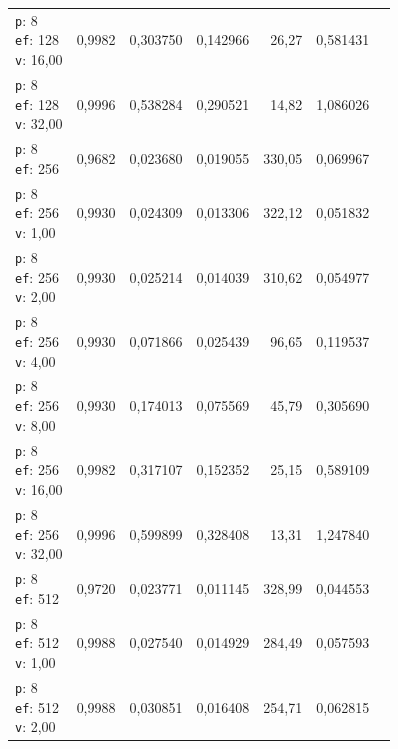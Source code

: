 \begin{table}[htbp]
\begin{tabularx}{\textwidth}{Xrrrrrr}
    \makecell{\texttt{p}: 8\\\texttt{ef}: 128\\\texttt{v}: 16,00} & 0,9982 & 0,303750 & 0,142966 & 26,27 & 0,581431 \\
    \makecell{\texttt{p}: 8\\\texttt{ef}: 128\\\texttt{v}: 32,00} & 0,9996 & 0,538284 & 0,290521 & 14,82 & 1,086026 \\
    \makecell{\texttt{p}: 8\\\texttt{ef}: 256} & 0,9682 & 0,023680 & 0,019055 & 330,05 & 0,069967 \\
    \makecell{\texttt{p}: 8\\\texttt{ef}: 256\\\texttt{v}: 1,00} & 0,9930 & 0,024309 & 0,013306 & 322,12 & 0,051832 \\
    \makecell{\texttt{p}: 8\\\texttt{ef}: 256\\\texttt{v}: 2,00} & 0,9930 & 0,025214 & 0,014039 & 310,62 & 0,054977 \\
    \makecell{\texttt{p}: 8\\\texttt{ef}: 256\\\texttt{v}: 4,00} & 0,9930 & 0,071866 & 0,025439 & 96,65 & 0,119537 \\
    \makecell{\texttt{p}: 8\\\texttt{ef}: 256\\\texttt{v}: 8,00} & 0,9930 & 0,174013 & 0,075569 & 45,79 & 0,305690 \\
    \makecell{\texttt{p}: 8\\\texttt{ef}: 256\\\texttt{v}: 16,00} & 0,9982 & 0,317107 & 0,152352 & 25,15 & 0,589109 \\
    \makecell{\texttt{p}: 8\\\texttt{ef}: 256\\\texttt{v}: 32,00} & 0,9996 & 0,599899 & 0,328408 & 13,31 & 1,247840 \\
    \makecell{\texttt{p}: 8\\\texttt{ef}: 512} & 0,9720 & 0,023771 & 0,011145 & 328,99 & 0,044553 \\
    \makecell{\texttt{p}: 8\\\texttt{ef}: 512\\\texttt{v}: 1,00} & 0,9988 & 0,027540 & 0,014929 & 284,49 & 0,057593 \\
    \makecell{\texttt{p}: 8\\\texttt{ef}: 512\\\texttt{v}: 2,00} & 0,9988 & 0,030851 & 0,016408 & 254,71 & 0,062815 \\

\end{tabularx}
\end{table}
